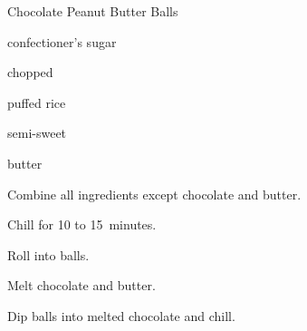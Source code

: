 \begin{recipe}{Chocolate Peanut Butter Balls}{}{}

\begin{ingredients}
\item {} 
\item {} confectioner's sugar
\item \C{\half} chopped 
\item \C{\half} puffed rice 
\item {} semi-sweet 
\item {} butter
\end{ingredients}

\begin{directions}
\item Combine all ingredients except chocolate and butter.
\item Chill for 10 to 15~minutes.
\item Roll into balls.
\item Melt chocolate and butter.
\item Dip balls into melted chocolate and chill.
\end{directions}
\end{recipe}

